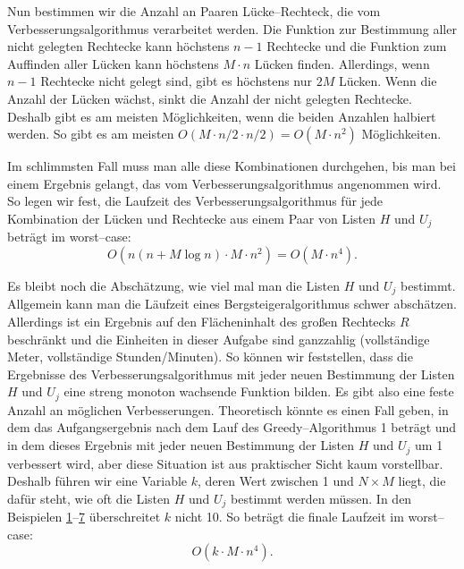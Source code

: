 Nun bestimmen wir die Anzahl an Paaren Lücke--Rechteck, die vom Verbesserungsalgorithmus
verarbeitet werden. Die Funktion zur Bestimmung aller nicht gelegten Rechtecke kann
höchstens $n-1$ Rechtecke und die Funktion zum Auffinden aller Lücken kann 
höchstens $M \cdot n$ Lücken finden.
Allerdings, wenn $n-1$ Rechtecke nicht gelegt sind, gibt es höchstens nur $2M$ Lücken.
Wenn die Anzahl der Lücken wächst, sinkt die Anzahl der nicht gelegten Rechtecke.
Deshalb gibt es am meisten Möglichkeiten, wenn die beiden Anzahlen halbiert werden.
So gibt es am meisten $O(M \cdot n/2 \cdot n/2) = O(M \cdot n^2)$ Möglichkeiten.

Im schlimmsten Fall muss man alle diese Kombinationen durchgehen, bis man
bei einem Ergebnis gelangt, das vom Verbesserungsalgorithmus angenommen wird.
So legen wir fest, die Laufzeit des Verbesserungsalgorithmus
für jede Kombination der Lücken und Rechtecke aus einem Paar von Listen $H$ und $U_j$
beträgt im worst--case:
\[
	O(n(n + M \log n) \cdot M \cdot n^2) = O(M \cdot n^4).
\]

Es bleibt noch die Abschätzung, wie viel mal man die Listen $H$ und $U_j$ bestimmt.
Allgemein kann man die Läufzeit eines Bergsteigeralgorithmus schwer abschätzen.
Allerdings ist ein Ergebnis auf den Flächeninhalt des großen Rechtecks $R$ beschränkt
und die Einheiten in dieser Aufgabe sind ganzzahlig (vollständige Meter, vollständige Stunden/Minuten).
So können wir feststellen, dass die Ergebnisse des Verbesserungsalgorithmus mit jeder
neuen Bestimmung der Listen $H$ und $U_j$ eine streng monoton wachsende Funktion bilden.
Es gibt also eine feste Anzahl an möglichen Verbesserungen.
Theoretisch könnte es einen Fall geben, in dem das Aufgangsergebnis nach dem Lauf
des Greedy--Algorithmus 1 beträgt und in dem dieses Ergebnis mit jeder 
neuen Bestimmung der Listen $H$ und $U_j$ um 1 verbessert wird,
aber diese Situation ist aus praktischer Sicht kaum vorstellbar. 
Deshalb führen wir eine Variable $k$, deren Wert zwischen 1 und $N \times M$ liegt, die
dafür steht, wie oft die Listen $H$ und $U_j$ bestimmt werden müssen.
In den Beispielen \hyperref[ex:1]{1}--\hyperref[ex:7]{7} überschreitet $k$ nicht 10.
So beträgt die finale Laufzeit im worst--case:
\[
	O(k \cdot M \cdot n^4).
\]
